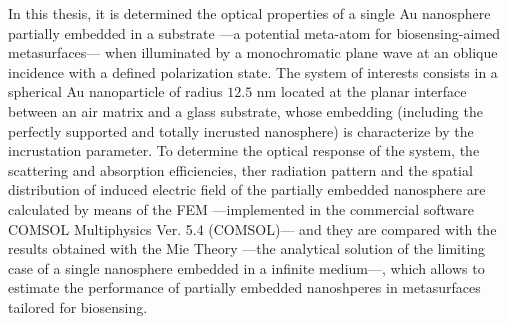 In this thesis, it is determined the optical properties of a single Au nanosphere partially embedded in a substrate ---a potential meta-atom for biosensing-aimed metasurfaces---  when illuminated by a monochromatic plane wave at an oblique incidence with a defined polarization state. The system of interests consists in a spherical Au nanoparticle of radius $12.5$ nm located at the planar interface between an air matrix and a glass substrate, whose embedding (including the perfectly supported and totally incrusted nanosphere) is characterize by the incrustation parameter. To determine the optical response of the system, the scattering and absorption efficiencies, ther radiation pattern and the spatial distribution of induced electric field of the partially embedded nanosphere are calculated by means of the FEM ---implemented in the commercial software COMSOL Multiphysics\texttrademark{} Ver. 5.4 (COMSOL)--- and they are compared with the results obtained with the Mie Theory ---the analytical solution of the limiting case of a single nanosphere embedded in a infinite medium---, which allows to estimate the performance of partially embedded nanoshperes in metasurfaces tailored for biosensing.

